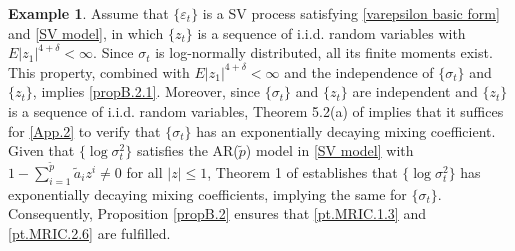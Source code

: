 \documentclass[ejsv2]{imsart}
\theoremstyle{plain}
\theoremstyle{definition}
\newtheorem{example}{Example}[section]
\theoremstyle{remark}
\begin{document}
\begin{example}
\label{ex3.2}
Assume that
$\{\varepsilon_t\}$ is a SV process satisfying \eqref{varepsilon basic form} and \eqref{SV model},
in which $\{z_t\}$ is a sequence of i.i.d. random variables with $E|z_1|^{4+\delta}<\infty$. Since $\sigma_t$ is log-normally distributed, all its finite moments exist. This property, combined with $E|z_1|^{4+\delta}<\infty$ and the independence of $\{\sigma_t\}$ and $\{z_t\}$, implies \eqref{propB.2.1}. Moreover, since $\{\sigma_t\}$ and $\{z_t\}$ are independent and $\{z_t\}$ is a sequence of i.i.d. random variables, Theorem 5.2(a) of \cite{Bradley2005} implies that it suffices for \eqref{App.2} to verify that $\{\sigma_t\}$ has an exponentially decaying mixing coefficient. Given that $\{\log\sigma_t^2\}$ satisfies the AR($\tilde{p}$) model in \eqref{SV model} with $1-\sum_{i=1}^{\tilde{p}}\tilde{a}_iz^i\neq0$ for all $|z|\leq1$, Theorem 1 of \cite{Mokkadem1988}
establishes that 
$\{\log\sigma_t^2\}$ has exponentially decaying mixing coefficients, implying the same for
$\{\sigma_t\}$. Consequently, Proposition
\ref{propB.2} ensures that
\eqref{pt.MRIC.1.3} and \eqref{pt.MRIC.2.6} are fulfilled.





\end{example}
\end{document}

